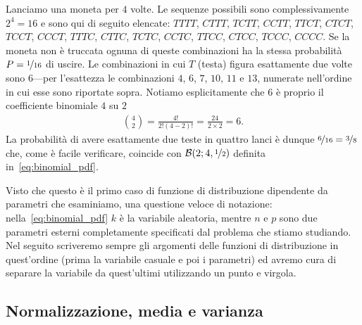 \begin{examplebox}
  \begin{example}
    Lanciamo una moneta per $4$ volte. Le sequenze possibili sono
    complessivamente $2^4 = 16$ e sono qui di seguito elencate:
    $TTTT$, $CTTT$, $TCTT$, $CCTT$, $TTCT$, $CTCT$, $TCCT$, $CCCT$,
    $TTTC$, $CTTC$, $TCTC$, $CCTC$, $TTCC$, $CTCC$, $TCCC$, $CCCC$.
    Se la moneta non è truccata ognuna di queste combinazioni ha la stessa
    probabilità $P = \nicefrac{1}{16}$ di uscire.  Le combinazioni in cui $T$
    (testa) figura esattamente due volte sono $6$---per l'esattezza le
    combinazioni $4$, $6$, $7$, $10$, $11$ e $13$, numerate nell'ordine in cui
    esse sono riportate sopra. Notiamo esplicitamente che $6$ è proprio
    il coefficiente binomiale $4$ su $2$
    \begin{align*}
      \binom{4}{2} = \frac{4!}{2! (4 - 2)!} = \frac{24}{2 \times 2} = 6.
    \end{align*}
    La probabilità di avere esattamente due teste in quattro lanci è dunque
    $\nicefrac{6}{16} = \nicefrac{3}{8}$ che, come è facile verificare,
    coincide con $\binomialpdf[4, \nicefrac{1}{2}]{2}$ definita
    in~\eqref{eq:binomial_pdf}.
  \end{example}
\end{examplebox}

Visto che questo è il primo caso di funzione di distribuzione dipendente da
parametri che esaminiamo, una questione veloce di notazione:
nella~\eqref{eq:binomial_pdf} $k$ è la variabile aleatoria, mentre $n$ e
$p$ sono due parametri esterni completamente specificati dal problema che stiamo
studiando. Nel seguito scriveremo sempre gli argomenti delle funzioni di
distribuzione in quest'ordine (prima la variabile casuale e poi i parametri)
ed avremo cura di separare la variabile da quest'ultimi utilizzando un punto
e virgola.



\subsection{Normalizzazione, media e varianza}

